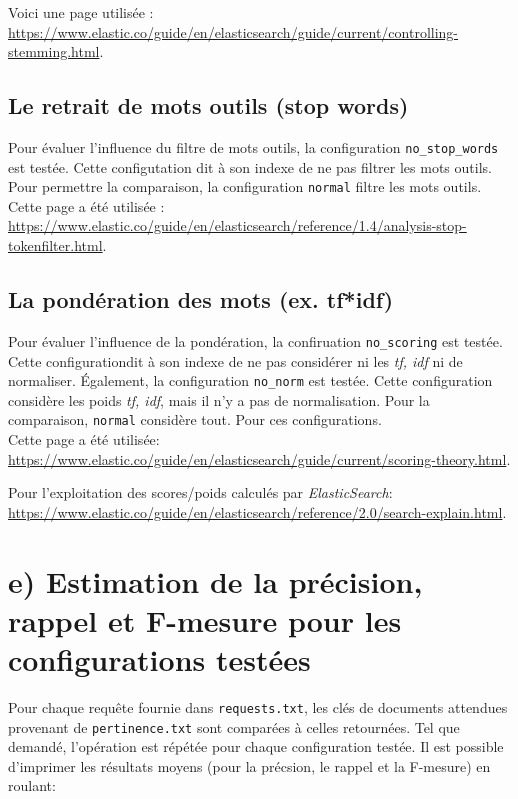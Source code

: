 \documentclass[12pt]{article}
\begin{document}
Voici une page utilisée : \url{https://www.elastic.co/guide/en/elasticsearch/guide/current/controlling-stemming.html}.

\subsection{Le retrait de mots outils (stop words)}
Pour évaluer l'influence du filtre de mots outils, la configuration \verb;no_stop_words; est testée. Cette configutation dit à son indexe de ne pas filtrer les mots outils. Pour permettre la comparaison, la configuration \verb;normal; filtre les mots outils.\\

Cette page a été utilisée : \url{https://www.elastic.co/guide/en/elasticsearch/reference/1.4/analysis-stop-tokenfilter.html}.

\subsection{La pondération des mots (ex. tf*idf)}
Pour évaluer l'influence de la pondération, la confiruation \verb;no_scoring; est testée. Cette configurationdit à son indexe de ne pas considérer ni les \textit{tf, idf} ni de normaliser. Également, la configuration \verb;no_norm; est testée. Cette configuration considère les poids \textit{tf, idf}, mais il n'y a pas de normalisation. Pour la comparaison, \verb;normal; considère tout. Pour ces configurations.\\

Cette page a été utilisée: \url{https://www.elastic.co/guide/en/elasticsearch/guide/current/scoring-theory.html}.

Pour l'exploitation des scores/poids calculés par \textit{ElasticSearch}: \url{https://www.elastic.co/guide/en/elasticsearch/reference/2.0/search-explain.html}.

\section{e) Estimation de la précision, rappel et F-mesure pour les configurations testées}

Pour chaque requête fournie dans \verb;requests.txt;, les clés de documents attendues provenant de \verb;pertinence.txt; sont comparées à celles retournées. Tel que demandé, l'opération est répétée pour chaque configuration testée. Il est possible d'imprimer les résultats moyens (pour la précsion, le rappel et la F-mesure) en roulant:
\end{document}
